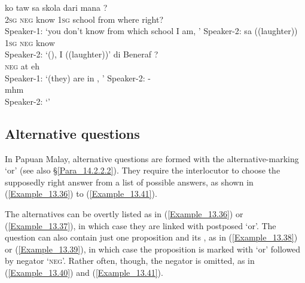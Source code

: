 \ea
\label{Example_13.34}
\ea
\label{Example_13.34a}
 {ko} {} {taw} {sa} {skola} {dari} {mana} {?}\\ %
  {}   \textsc{2sg}  \textsc{neg}  know  \textsc{1sg}  school  from  where  right?\\
\glt Speaker-1: ‘you don’t know from which school I am, ’
\vspace{10pt}
\ex
\label{Example_13.34b}
\gll    Speaker-2:  {}  sa      ((laughter))\\
  {} {}  \textsc{1sg}  \textsc{neg}  know  \\
\glt Speaker-2: ‘(), I  ((laughter))’ \textstyleExampleSource{[080922-003-Cv.0031-0032]}
\z
\z
\ea
\label{Example_13.35}
\ea
\label{Example_13.35a}
 {} {di} {Beneraf} {?}\\ %
 {}    \textsc{neg}  at    eh\\
\glt Speaker-1: ‘(they) are  in , ’
\vspace{10pt}
\ex
\label{Example_13.35b}
\gll   Speaker-2:  -\\
 {}    mhm\\
\glt Speaker-2: ‘’ \textstyleExampleSource{[080925-003-Cv.0173-0174]}
\z
\z

\subsection{Alternative questions}
\label{Para_13.2.3}
In Papuan Malay, alternative questions are formed with the alternative-marking   ‘or’ (see also §\ref{Para_14.2.2.2}). They require the interlocutor to choose the supposedly right answer from a list of possible answers, as shown in (\ref{Example_13.36}) to (\ref{Example_13.41}).



The alternatives can be overtly listed as in (\ref{Example_13.36}) or (\ref{Example_13.37}), in which case they are linked with postposed  ‘or’. The question can also contain just one proposition and its , as in (\ref{Example_13.38}) or (\ref{Example_13.39}), in which case the proposition is marked with  ‘or’ followed by negator  ‘\textsc{neg}’. Rather often, though, the negator is omitted, as in (\ref{Example_13.40}) and (\ref{Example_13.41}).


